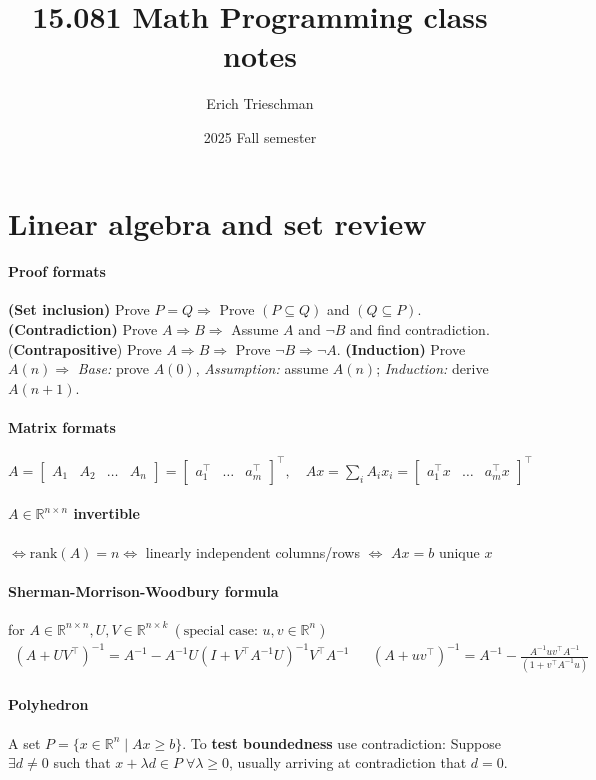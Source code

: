 \documentclass{article}
\title{15.081 Math Programming class notes}
\author{Erich Trieschman}
\date{2025 Fall semester}
\begin{document}
\section{Linear algebra and set review}
\paragraph{Proof formats} \textbf{(Set inclusion)} Prove $P = Q \Longrightarrow$ Prove $(P\subseteq Q)$ and $(Q\subseteq P)$. \textbf{(Contradiction)} Prove $A \Rightarrow B \Longrightarrow$ Assume $A$ and $\neg B$ and find contradiction. (\textbf{Contrapositive}) Prove $A \Rightarrow B \Longrightarrow$ Prove $\neg B\Rightarrow \neg A$. \textbf{(Induction)} Prove $A(n) \Longrightarrow$ \emph{Base:} prove $A(0)$, \emph{Assumption:} assume $A(n)$; \emph{Induction:} derive $A(n+1)$.

\paragraph{Matrix formats} $A = \begin{bmatrix}A_1 & A_2& \dots & A_n\end{bmatrix} = 
    \begin{bmatrix} a_1^\top  & \dots & a_m^\top \end{bmatrix}^\top ,\quad Ax = \sum_i A_ix_i = 
    \begin{bmatrix} a_1^\top x & \dots & a_m^\top x \end{bmatrix}^\top $

\paragraph{$A \in \mathbb R^{n\times n}$ invertible} $\iff \text{rank}(A) = n \iff$ linearly independent columns/rows $\iff$ $Ax=b$ unique $x$

\paragraph{Sherman-Morrison-Woodbury formula} 
for $A\in \mathbb{R}^{n\times n}, U,V \in \mathbb{R}^{n\times k}\ (\text{special case: } u,v \in \mathbb R^n)$
\begin{align*}
    (A+UV^\top)^{-1} = A^{-1} - A^{-1}U(I+V^\top A^{-1}U)^{-1}V^\top A^{-1}
    && (A+uv^\top)^{-1} = A^{-1} - \frac{A^{-1}uv^\top A^{-1}}{(1+v^\top A^{-1}u)}
\end{align*}


\paragraph{Polyhedron} A set $P=\{x \in \mathbb R^n \mid Ax \geq b\}$. To \textbf{test boundedness} use contradiction: Suppose $\exists d\neq 0$ such that $x + \lambda d \in P\; \forall \lambda \geq 0$, usually arriving at contradiction that $d=0$. 
\end{document}
